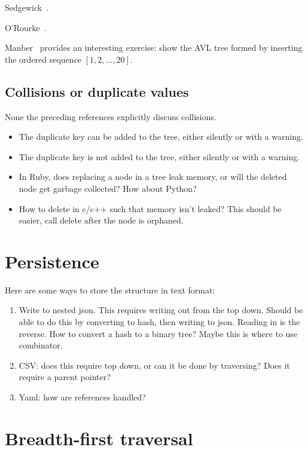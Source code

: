 \documentclass{article}
\begin{document}
Sedgewick~\cite{sedgewick:r1990}.

O'Rourke~\cite{orourke:j1998}.

Manber~\cite[p. 87, Ex. 4.8]{manber:u1989} provides an interesting exercise:
show the AVL tree formed by inserting the ordered sequence $[1, 2, \ldots, 20]$.

\subsection{Collisions or duplicate values}

None the preceding references explicitly discuss collisions.

\begin{itemize}
\item The duplicate key can be added to the tree, either silently or with a warning.
\item The duplicate key is not added to the tree, either silently or with a warning.

\item In Ruby, does replacing a node in a tree leak memory, or will the deleted node
get garbage collected? How about Python?

\item How to delete in c/c++ such that memory isn't leaked? This should be easier,
call delete after the node is orphaned.
\end{itemize}

\section{Persistence}

Here are some ways to store the structure in text format:

\begin{enumerate}
\item Write to nested json. This requires writing out from the top
down. Should be able to do this by converting to hash, then
writing to json. Reading in is the reverse. How to convert a
hash to a binary tree? Maybe this is where to use combinator.

\item CSV: does this require top down, or can it be done by traversing?
Does it require a parent pointer?

\item Yaml: how are references handled?
\end{enumerate}


\section{Breadth-first traversal}
\end{document}
